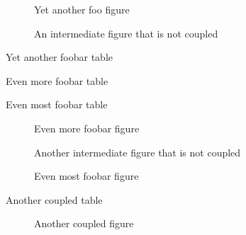 \documentclass{article}
\begin{document}
\begin{figure}[!ht]

\caption{Yet another foo figure}
\end{figure}


\blindtext[10]

\begin{figure}[!ht]

\caption{An intermediate figure that is not coupled}
\end{figure}


\begin{table}[!ht]
\caption{Yet another foobar table}
\end{table}

\begin{table}[!ht]
\caption{Even more foobar table}
\end{table}

\begin{table}[!ht]
\caption{Even most foobar table}
\end{table}



\begin{figure}[!ht]

\caption{Even more foobar figure}
\end{figure}

\clearpage

\begin{figure}[!ht]

\caption{Another intermediate figure that is not coupled}
\end{figure}




\begin{figure}[!ht]
\caption{Even most foobar figure}
\end{figure}

\begin{table}[!ht]
\caption{Another coupled table}
\end{table}

\begin{figure}[!ht]
\caption{Another coupled figure}
\end{figure}
\end{document}
